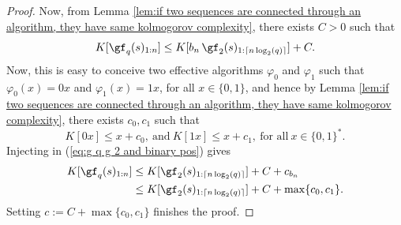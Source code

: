 \begin{proof}
Now, from Lemma \ref{lem:if two sequences are connected through an algorithm, they have same kolmogorov complexity}, there exists $C > 0$ such that
\begin{equation}\label{eq:g q g 2 and binary pos}
	K[\gf_q(s)_{1:n}] \leq K[b_n \, \gf_2(s)_{1:\lceil n \log_2(q)\rceil}] + C.
\end{equation}
Now, this is easy to conceive two effective algorithms $\varphi_0$ and $\varphi_1$ such that $\varphi_0(x) = 0x$ and $\varphi_1(x) = 1x$, for all $x \in \{0,1\}$, and hence by Lemma \ref{lem:if two sequences are connected through an algorithm, they have same kolmogorov complexity}, there exists $c_0,c_1$ such that 
\begin{equation}
	K[0x] \leq x + c_0, \ \text{and} \ K[1x] \leq x + c_1, \ \text{for all} \ x \in \{0,1\}^\ast.
\end{equation}
Injecting in (\ref{eq:g q g 2 and binary pos}) gives
\begin{align}%
	K[\gf_q(s)_{1:n}] &\leq K[\gf_2(s)_{1:\lceil n \log_2(q)\rceil}] + C + c_{b_n}\\
	&\leq K[\gf_2(s)_{1:\lceil n \log_2(q)\rceil}] + C + \max \{c_0, c_1\}.
\end{align}
Setting $c := C + \max \{c_0, c_1\}$ finishes the proof.
\end{proof}


